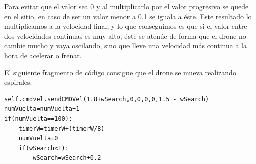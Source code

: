 
\hspace{1cm}Para evitar que el valor sea 0 y al multiplicarlo por el valor progresivo se quede en el sitio, en caso de ser un valor menor a 0.1 se iguala a \'este. Este resultado lo multiplicamos a la velocidad final, y lo que conseguimos es que si el valor entre dos velocidades continuas es muy alto, \'este se aten\'ue de forma que el drone no cambie mucho y vaya oscilando, sino que lleve una velocidad m\'as continua a la hora de acelerar o frenar.  

El siguiente fragmento de c\'odigo consigue que el drone se mueva realizando espirales: \\

\begin{lstlisting}[backgroundcolor=\color{yellow}]
self.cmdvel.sendCMDVel(1.8+wSearch,0,0,0,0,1.5 - wSearch)
numVuelta=numVuelta+1
if(numVuelta==100):
    timerW=timerW+(timerW/8)
    numVuelta=0
    if(wSearch<1):
        wSearch=wSearch+0.2
\end{lstlisting}

